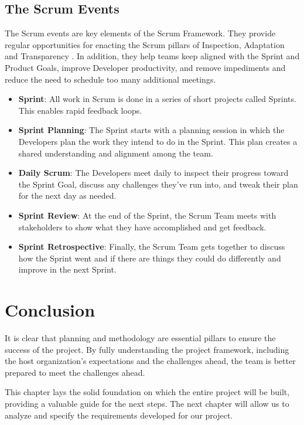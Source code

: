 \subsection{The Scrum Events}

The Scrum events are key elements of the Scrum Framework. They provide regular opportunities for enacting the Scrum pillars of Inspection, Adaptation and Transparency \cite{ScrumGuide2020}. In addition, they help teams keep aligned with the Sprint and Product Goals, improve Developer productivity, and remove impediments and reduce the need to schedule too many additional meetings.

\begin{itemize}
    \item \textbf{Sprint}: All work in Scrum is done in a series of short projects called Sprints. This enables rapid feedback loops.
    
    \item \textbf{Sprint Planning}: The Sprint starts with a planning session in which the Developers plan the work they intend to do in the Sprint. This plan creates a shared understanding and alignment among the team.
    
    \item \textbf{Daily Scrum}: The Developers meet daily to inspect their progress toward the Sprint Goal, discuss any challenges they've run into, and tweak their plan for the next day as needed.
    
    \item \textbf{Sprint Review}: At the end of the Sprint, the Scrum Team meets with stakeholders to show what they have accomplished and get feedback.
    
    \item \textbf{Sprint Retrospective}: Finally, the Scrum Team gets together to discuss how the Sprint went and if there are things they could do differently and improve in the next Sprint.
\end{itemize}

\section*{Conclusion}

It is clear that planning and methodology are essential pillars to ensure the success of the project. By fully understanding the project framework, including the host organization's expectations and the challenges ahead, the team is better prepared to meet the challenges ahead.

This chapter lays the solid foundation on which the entire project will be built, providing a valuable guide for the next steps. The next chapter will allow us to analyze and specify the requirements developed for our project. 